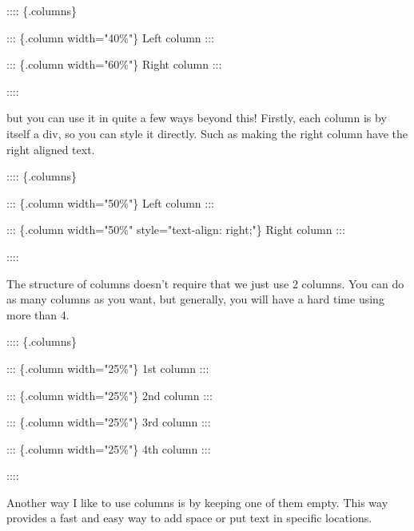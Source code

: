 \documentclass[
  letterpaper,
  DIV=11,
  numbers=noendperiod]{scrreprt}
\newenvironment{Shaded}{\begin{snugshade}}{\end{snugshade}}
\newcommand{\NormalTok}[1]{\textcolor[rgb]{0.00,0.23,0.31}{#1}}
\begin{document}
\begin{Shaded}
\begin{Highlighting}[]
\NormalTok{:::: \{.columns\}}

\NormalTok{::: \{.column width="40\%"\}}
\NormalTok{Left column}
\NormalTok{:::}

\NormalTok{::: \{.column width="60\%"\}}
\NormalTok{Right column}
\NormalTok{:::}

\NormalTok{::::}
\end{Highlighting}
\end{Shaded}

but you can use it in quite a few ways beyond this! Firstly, each column
is by itself a div, so you can style it directly. Such as making the
right column have the right aligned text.

\begin{Shaded}
\begin{Highlighting}[]
\NormalTok{:::: \{.columns\}}

\NormalTok{::: \{.column width="50\%"\}}
\NormalTok{Left column}
\NormalTok{:::}

\NormalTok{::: \{.column width="50\%" style="text{-}align: right;"\}}
\NormalTok{Right column}
\NormalTok{:::}

\NormalTok{::::}
\end{Highlighting}
\end{Shaded}

The structure of columns doesn't require that we just use 2 columns. You
can do as many columns as you want, but generally, you will have a hard
time using more than 4.

\begin{Shaded}
\begin{Highlighting}[]
\NormalTok{:::: \{.columns\}}

\NormalTok{::: \{.column width="25\%"\}}
\NormalTok{1st column}
\NormalTok{:::}

\NormalTok{::: \{.column width="25\%"\}}
\NormalTok{2nd column}
\NormalTok{:::}

\NormalTok{::: \{.column width="25\%"\}}
\NormalTok{3rd column}
\NormalTok{:::}

\NormalTok{::: \{.column width="25\%"\}}
\NormalTok{4th column}
\NormalTok{:::}

\NormalTok{::::}
\end{Highlighting}
\end{Shaded}

Another way I like to use columns is by keeping one of them empty. This
way provides a fast and easy way to add space or put text in specific
locations.
\end{document}

